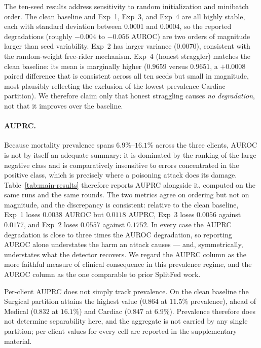 \documentclass[pdflatex,sn-mathphys-num]{sn-jnl}
\begin{document}
The ten-seed results address sensitivity to random initialization and minibatch order. The clean baseline and Exp~1, Exp~3, and Exp~4 are all highly stable, each with standard deviation between 0.0001 and 0.0004, so the reported degradations (roughly $-0.004$ to $-0.056$ AUROC) are two orders of magnitude larger than seed variability. Exp~2 has larger variance ($0.0070$), consistent with the random-weight free-rider mechanism. Exp~4 (honest straggler) matches the clean baseline: its mean is marginally higher ($0.9659$ versus $0.9651$, a $+0.0008$ paired difference that is consistent across all ten seeds but small in magnitude, most plausibly reflecting the exclusion of the lowest-prevalence Cardiac partition). We therefore claim only that honest straggling causes \emph{no degradation}, not that it improves over the baseline.

\paragraph{AUPRC.} Because mortality prevalence spans $6.9\%$--$16.1\%$ across the three clients, AUROC is not by itself an adequate summary: it is dominated by the ranking of the large negative class and is comparatively insensitive to errors concentrated in the positive class, which is precisely where a poisoning attack does its damage. Table~\ref{tab:main-results} therefore reports AUPRC alongside it, computed on the same runs and the same rounds. The two metrics agree on ordering but not on magnitude, and the discrepancy is consistent: relative to the clean baseline, Exp~1 loses $0.0038$ AUROC but $0.0118$ AUPRC, Exp~3 loses $0.0056$ against $0.0177$, and Exp~2 loses $0.0557$ against $0.1752$. In every case the AUPRC degradation is close to three times the AUROC degradation, so reporting AUROC alone understates the harm an attack causes --- and, symmetrically, understates what the detector recovers. We regard the AUPRC column as the more faithful measure of clinical consequence in this prevalence regime, and the AUROC column as the one comparable to prior SplitFed work.

Per-client AUPRC does not simply track prevalence. On the clean baseline the Surgical partition attains the highest value ($0.864$ at $11.5\%$ prevalence), ahead of Medical ($0.832$ at $16.1\%$) and Cardiac ($0.847$ at $6.9\%$). Prevalence therefore does not determine separability here, and the aggregate is not carried by any single partition; per-client values for every cell are reported in the supplementary material.
\end{document}
